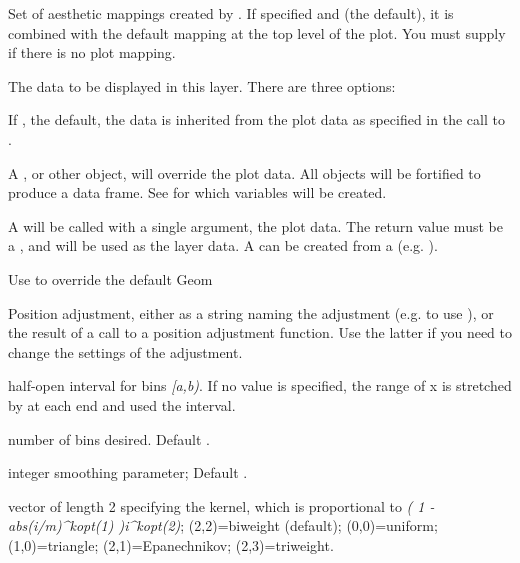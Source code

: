 \documentclass[a4paper]{book}
\begin{document}
\begin{Arguments}
\begin{ldescription}
\item[\code{mapping}] Set of aesthetic mappings created by . If specified and
 (the default), it is combined with the default mapping
at the top level of the plot. You must supply  if there is no plot
mapping.

\item[\code{data}] The data to be displayed in this layer. There are three
options:

If , the default, the data is inherited from the plot
data as specified in the call to .

A , or other object, will override the plot
data. All objects will be fortified to produce a data frame. See
 for which variables will be created.

A  will be called with a single argument,
the plot data. The return value must be a , and
will be used as the layer data. A  can be created
from a  (e.g. ).

\item[\code{geom}] Use to override the default Geom

\item[\code{position}] Position adjustment, either as a string naming the adjustment
(e.g.  to use ), or the result of a call to a
position adjustment function. Use the latter if you need to change the
settings of the adjustment.

\item[\code{ab}] half-open interval for bins \emph{[a,b)}. If no value is specified,
the range of x is stretched by  at each end and used the
interval.

\item[\code{nbin}] number of bins desired. Default .

\item[\code{m}] integer smoothing parameter; Default .

\item[\code{kopt}] vector of length 2 specifying the kernel, which is proportional
to \emph{( 1 - abs(i/m)\textasciicircum{}kopt(1) )i\textasciicircum{}kopt(2)}; (2,2)=biweight (default);
(0,0)=uniform; (1,0)=triangle; (2,1)=Epanechnikov; (2,3)=triweight.


\end{ldescription}
\end{Arguments}
\end{document}
